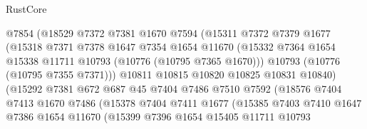 \begin{lexlean}{RustCore}
\begin{coremodule}
                            @7854
                            (@18529
                              @7372
                              @7381
                              @1670
                              @7594
                              (@15311
                                @7372
                                @7379
                                @1677
                                (@15318
                                  @7371
                                  @7378
                                  @1647
                                  @7354
                                  @1654
                                  @11670
                                  (@15332
                                    @7364
                                    @1654
                                    @15338
                                    @11711
                                    @10793
                                    (@10776 (@10795 @7365 @1670)))
                                  @10793
                                  (@10776 (@10795 @7355 @7371)))
                                @10811
                                @10815
                                @10820
                                @10825
                                @10831
                                @10840)
                              (@15292
                                @7381
                                @672
                                @687
                                @45
                                @7404
                                @7486
                                @7510
                                @7592
                                (@18576
                                  @7404
                                  @7413
                                  @1670
                                  @7486
                                  (@15378
                                    @7404
                                    @7411
                                    @1677
                                    (@15385
                                      @7403
                                      @7410
                                      @1647
                                      @7386
                                      @1654
                                      @11670
                                      (@15399
                                        @7396
                                        @1654
                                        @15405
                                        @11711
                                        @10793

\end{coremodule}
\end{lexlean}
